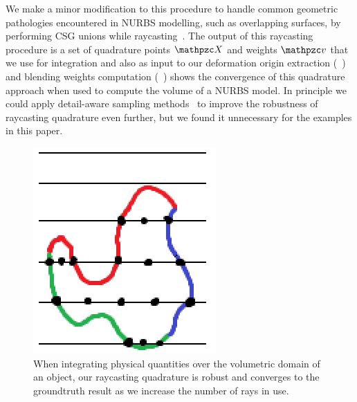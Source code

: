 We make a minor modification to this procedure to handle common geometric pathologies encountered in NURBS modelling, such as overlapping surfaces, by performing 
CSG unions while raycasting~\cite{ROTH1982109}. 
The output of this raycasting procedure is a set of quadrature points $\st{X}$ and weights $\st{v}$ that we use for integration and also as input to our 
deformation origin extraction (~) and blending weights computation (~)
 shows the convergence of this quadrature approach when used to compute the volume of a NURBS model. 
In principle we could apply detail-aware sampling methods~\cite{DBLP:journals/tog/WangFP12} to improve the robustness of raycasting quadrature even further,
but we found it unnecessary for the examples in this paper.
\begin{figure}
    \includegraphics[width=\columnwidth]{figures/raycasting_quadrature}
    \caption{When integrating physical quantities over the volumetric domain of an object, our raycasting quadrature is robust and converges to the groundtruth result as we increase the number of rays in use. }
    \label{fig:raycasting}
\end{figure}

